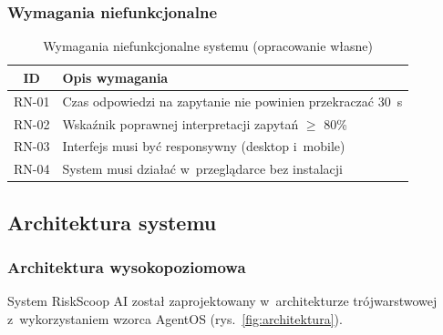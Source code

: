 \subsubsection{Wymagania niefunkcjonalne}

\begin{table}[H]
    \centering
    \caption{Wymagania niefunkcjonalne systemu (opracowanie własne)}
    \begin{tabular}{|c|p{10cm}|}
        \hline
        \textbf{ID} & \textbf{Opis wymagania} \\
        \hline
        RN-01 & Czas odpowiedzi na zapytanie nie powinien przekraczać 30~s \\
        \hline
        RN-02 & Wskaźnik poprawnej interpretacji zapytań $\geq$ 80\% \\
        \hline
        RN-03 & Interfejs musi być responsywny (desktop i~mobile) \\
        \hline
        RN-04 & System musi działać w~przeglądarce bez instalacji \\
        \hline
    \end{tabular}
    \label{tab:wymagania_niefunkcjonalne}
\end{table}

\subsection{Architektura systemu}

\subsubsection{Architektura wysokopoziomowa}

System RiskScoop AI został zaprojektowany w~architekturze trójwarstwowej z~wykorzystaniem wzorca AgentOS (rys.~\ref{fig:architektura}).

